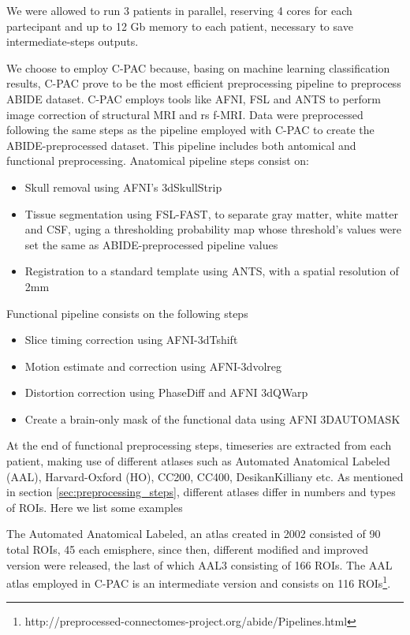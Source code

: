 \documentclass[11pt]{report}
\begin{document}
We were allowed to run 3 patients in parallel, reserving 4 cores for each partecipant and up to 12 Gb memory to each patient, necessary to save intermediate-steps outputs.

We choose to employ C-PAC because, basing on machine learning classification results, \cite{yang2020} C-PAC prove to be the most efficient preprocessing pipeline to preprocess ABIDE dataset.
C-PAC employs tools like AFNI, FSL and ANTS to perform image correction of structural MRI and rs f-MRI.
Data were preprocessed following the same steps as the pipeline employed with C-PAC to create the ABIDE-preprocessed dataset.
This pipeline includes both antomical and functional preprocessing.
Anatomical pipeline steps consist on:
\begin{itemize}
\item Skull removal using AFNI's 3dSkullStrip
\item Tissue segmentation using FSL-FAST, to separate gray matter, white matter and CSF, uging a thresholding probability map whose threshold's values were set the same as ABIDE-preprocessed pipeline values
\item Registration to a standard template using ANTS, with a spatial resolution of 2mm
\end{itemize}
Functional pipeline consists on the following steps
\begin{itemize}
\item Slice timing correction using AFNI-3dTshift
\item Motion estimate and correction using AFNI-3dvolreg
\item Distortion correction using PhaseDiff and AFNI 3dQWarp
\item Create a brain-only mask of the functional data using AFNI 3DAUTOMASK
\end{itemize}

\hfill

At the end of functional preprocessing steps, timeseries are extracted from each patient, making use of different atlases such as Automated Anatomical Labeled (AAL), Harvard-Oxford (HO), CC200, CC400, DesikanKilliany etc.
As mentioned in section \ref{sec:preprocessing_steps}, different atlases differ in numbers and types of ROIs. Here we list some examples

The Automated Anatomical Labeled, an atlas created in 2002 \cite{mazoyer-2002} consisted of 90 total ROIs, 45 each emisphere, since then, different modified and improved version were released, the last of which AAL3 consisting of 166 ROIs. The AAL atlas employed in C-PAC is an intermediate version and consists on 116 ROIs\footnote{http://preprocessed-connectomes-project.org/abide/Pipelines.html}.
\end{document}
